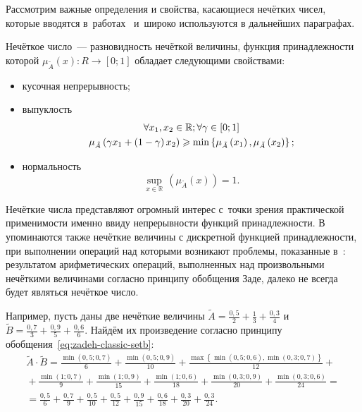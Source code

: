 Рассмотрим важные определения и свойства, касающиеся нечётких чисел, которые вводятся в~работах~\cite{Rutkovskaya, Pegat, Borisov_Alexeev_Msk, Pospelov} и~широко используются в дальнейших параграфах.
\begin{mydef}
Нечёткое число~--- разновидность нечёткой величины, функция принадлежности которой $\mu_{\tilde A}\left( x \right):R\to \left[ 0;1 \right]$ обладает следующими свойствами:
\begin{itemize}
	\item кусочная непрерывность;
	\item выпуклость
	\begin{gather}
			 \forall x_1, x_2 \in \mathbb{R}; \forall \gamma \in \left[ 0;1 \right] \notag \\
	 		\label{eq:convex-set}
			 \mu_{\tilde A}\left( \gamma x_1+\left( 1-\gamma  \right)x_2 \right)\geqslant \min \left\{ \mu_{\tilde A}\left( x_1 \right),\mu_{\tilde A}\left( x_2 \right) \right\};
	\end{gather}
	\item нормальность
	\begin{equation}
		\label{eq:normal-set}
		\underset{x\in \mathbb{R}}{\mathop {\sup}}{}\, \left( \mu_{\tilde A} \left( x \right) \right)=1.
	\end{equation}
\end{itemize}
\end{mydef}

Нечёткие числа представляют огромный интерес с~точки зрения практической применимости именно ввиду непрерывности функций принадлежности. В~\cite{Zimmermann} упоминаются также нечёткие величины с дискретной функцией принадлежности, при выполнении операций над которыми возникают проблемы, показанные в~\cite{Rutkovskaya}: результатом арифметических операций, выполненных над произвольными нечёткими величинами согласно принципу обобщения Заде, далеко не всегда будет являться нечёткое число. 

Например, пусть даны две нечёткие величины $\displaystyle \tilde{A}=\frac{0,5}{2}+\frac{1}{3}+\frac{0,3}{4}$ и $\displaystyle \tilde{B}=\frac{0,7}{3}+\frac{0,9}{5}+\frac{0,6}{6}$. Найдём их произведение согласно принципу обобщения~\eqref{eq:zadeh-classic-setb}:
\begin{gather*}
	\tilde{A}\cdot \tilde{B}=\frac{\min \left( 0,5;0,7 \right)}{6}+\frac{\min \left( 0,5;0,9 \right)}{10}+\frac{\max \left\{\min \left( 0,5;0,6 \right),\min \left( 0,3;0,7 \right) \right\}}{12}+{} \\
	{} +\frac{\min \left( 1;0,7 \right)}{9}+\frac{\min \left( 1;0,9 \right)}{15}+\frac{\min \left( 1;0,6 \right)}{18}+\frac{\min \left( 0,3;0,9 \right)}{20}+\frac{\min \left( 0,3;0,6 \right)}{24}={} \\
	{}=\frac{0,5}{6}+\frac{0,7}{9}+\frac{0,5}{10}+\frac{0,5}{12}+\frac{0,9}{15}+\frac{0,6}{18}+\frac{0,3}{20}+\frac{0,3}{24}.
\end{gather*}

